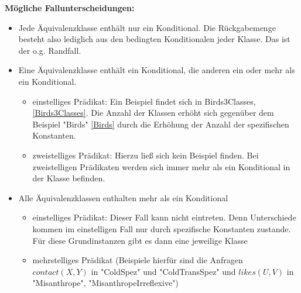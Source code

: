 \documentclass[draft]{scrreprt}
\begin{document}
\textbf{Mögliche Fallunterscheidungen:}
\begin{itemize}
	\item Jede Äquivalenzklasse enthält nur ein Konditional. Die Rückgabemenge besteht also lediglich aus den bedingten Konditionalen jeder Klasse. Das ist der o.g. Randfall.
	\item Eine Äquivalenzklasse enthält ein Konditional, die anderen ein oder mehr als ein Konditional. 
	\begin{itemize}
		\item einstelliges Prädikat: Ein Beispiel findet sich in Birds3Classes, \ref{Birds3Classes}. Die Anzahl der Klassen erhöht sich gegenüber dem Beispiel "{}Birds"{} \ref{Birds} durch die Erhöhung der Anzahl der spezifischen Konstanten.\\
		\item zweistelliges Prädikat: Hierzu ließ sich kein Beispiel finden. Bei zweistelligen Prädikaten werden sich immer mehr als ein Konditional in der Klasse befinden.
	\end{itemize}
	\item Alle Äquivalenzklassen enthalten mehr als ein Konditional
	\begin{itemize}
		\item einstelliges Prädikat: Dieser Fall kann nicht eintreten. Denn Unterschiede kommen im einstelligen Fall nur durch spezifische Konstanten zustande. Für diese Grundinstanzen gibt es dann eine jeweilige Klasse\\
		\item mehrstelliges Prädikat (Beispiele hierfür sind die Anfragen $ contact(X,Y) $ in "{}ColdSpez"{} und "{}ColdTransSpez"{} und $ likes(U,V) $ in "{}Misanthrope"{}, "{}MisanthropeIrreflexive"{}) \\
	\end{itemize}
\end{itemize}
\end{document}
